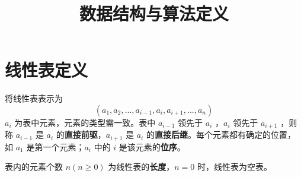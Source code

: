 \documentclass[12pt]{article}
\title{数据结构与算法定义}
\date{}
\begin{document}
\maketitle
\tableofcontents

\section{线性表定义}

将线性表表示为 $$(a_1, a_2, ..., a_{i-1}, a_i, a_{i+1}, ..., a_n)$$ $a_i$ 为表中元素，元素的类型需一致。表中 $a_{i-1}$ 领先于 $a_i$ ，$a_i$ 领先于 $a_{i+1}$ ，则称 $a_{i-1}$ 是 $a_i$ 的\textbf{直接前驱}，$a_{i+1}$ 是 $a_i$ 的\textbf{直接后继}。每个元素都有确定的位置，如 $a_1$ 是第一个元素；$a_i$ 中的 $i$ 是该元素的\textbf{位序}。

表内的元素个数 $n(n\geq0)$ 为线性表的\textbf{长度}，$n=0$ 时，线性表为空表。
\end{document}
